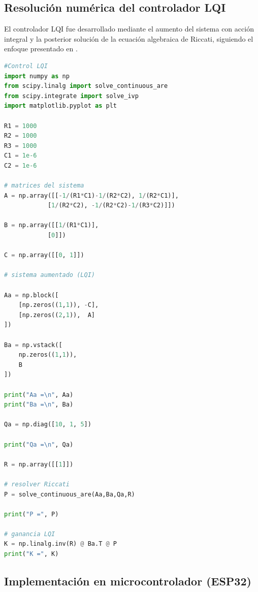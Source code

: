 \documentclass[12pt,letterpaper,twoside]{article}
\begin{document}
\subsection{Resolución numérica del controlador LQI}
\label{sec:SolveLQI}

El controlador LQI fue desarrollado mediante el aumento del sistema con acción integral y la posterior solución de la ecuación algebraica de Riccati, siguiendo el enfoque presentado en \cite{Kirk}.

\begin{lstlisting}[language=Python]
#Control LQI
import numpy as np
from scipy.linalg import solve_continuous_are
from scipy.integrate import solve_ivp
import matplotlib.pyplot as plt

R1 = 1000
R2 = 1000
R3 = 1000
C1 = 1e-6
C2 = 1e-6

# matrices del sistema
A = np.array([[-1/(R1*C1)-1/(R2*C2), 1/(R2*C1)],
            [1/(R2*C2), -1/(R2*C2)-1/(R3*C2)]])

B = np.array([[1/(R1*C1)],
            [0]])

C = np.array([[0, 1]])

# sistema aumentado (LQI)

Aa = np.block([
    [np.zeros((1,1)), -C],
    [np.zeros((2,1)),  A]
])

Ba = np.vstack([
    np.zeros((1,1)),
    B
])

print("Aa =\n", Aa)
print("Ba =\n", Ba)

Qa = np.diag([10, 1, 5])

print("Qa =\n", Qa)

R = np.array([[1]])

# resolver Riccati
P = solve_continuous_are(Aa,Ba,Qa,R)

print("P =", P)

# ganancia LQI
K = np.linalg.inv(R) @ Ba.T @ P
print("K =", K)
\end{lstlisting}

\subsection{Implementación en microcontrolador (ESP32)}
\label{sec:esp32}
\end{document}

